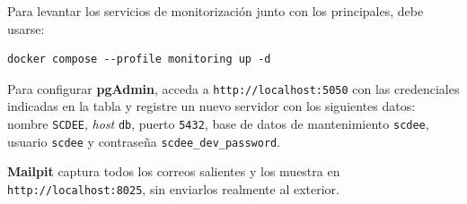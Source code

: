 Para levantar los servicios de monitorización junto con los principales,
debe usarse:

\begin{verbatim}
docker compose --profile monitoring up -d
\end{verbatim}

Para configurar \textbf{pgAdmin}, acceda a \texttt{http://localhost:5050}
con las credenciales indicadas en la tabla y registre un nuevo servidor
con los siguientes datos: nombre \texttt{SCDEE}, \textit{host}
\texttt{db}, puerto \texttt{5432}, base de datos de mantenimiento
\texttt{scdee}, usuario \texttt{scdee} y contraseña
\texttt{scdee\_dev\_password}.

\textbf{Mailpit} captura todos los correos salientes y los muestra en
\texttt{http://localhost:8025}, sin enviarlos realmente al exterior.
